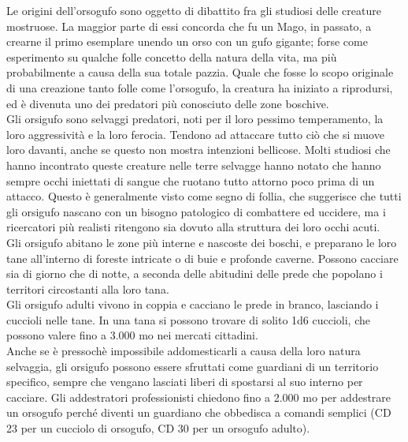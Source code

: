 \begin{multicols}{2}
Le origini dell’orsogufo sono oggetto di dibattito fra gli studiosi delle creature mostruose. La maggior parte di essi concorda che fu un Mago, in passato, a crearne il primo esemplare unendo un orso con un gufo gigante; forse come esperimento su qualche folle concetto della natura della vita, ma più probabilmente a causa della sua totale pazzia. Quale che fosse lo scopo originale di una creazione tanto folle come l’orsogufo, la creatura ha iniziato a riprodursi, ed è divenuta uno dei predatori più conosciuto delle zone boschive.\\
Gli orsigufo sono selvaggi predatori, noti per il loro pessimo temperamento, la loro aggressività e la loro ferocia. Tendono ad attaccare tutto ciò che si muove loro davanti, anche se questo non mostra intenzioni bellicose. Molti studiosi che hanno incontrato queste creature nelle terre selvagge hanno notato che hanno sempre occhi iniettati di sangue che ruotano tutto attorno poco prima di un attacco. Questo è generalmente visto come segno di follia, che suggerisce che tutti gli orsigufo nascano con un bisogno patologico di combattere ed uccidere, ma i ricercatori più realisti ritengono sia dovuto alla struttura dei loro occhi acuti.\\
Gli orsigufo abitano le zone più interne e nascoste dei boschi, e preparano le loro tane all’interno di foreste intricate o di buie e profonde caverne. Possono cacciare sia di giorno che di notte, a seconda delle abitudini delle prede che popolano i territori circostanti alla loro tana.\\
Gli orsigufo adulti vivono in coppia e cacciano le prede in branco, lasciando i cuccioli nelle tane. In una tana si possono trovare di solito 1d6 cuccioli, che possono valere fino a 3.000 mo nei mercati cittadini.\\

Anche se è pressochè impossibile addomesticarli a causa della loro natura selvaggia, gli orsigufo possono essere sfruttati come guardiani di un territorio specifico, sempre che vengano lasciati liberi di spostarsi al suo interno per cacciare. Gli addestratori professionisti chiedono fino a 2.000 mo per addestrare un orsogufo perché diventi un guardiano che obbedisca a comandi semplici (CD 23 per un cucciolo di orsogufo, CD 30 per un orsogufo adulto).\\


\end{multicols}
